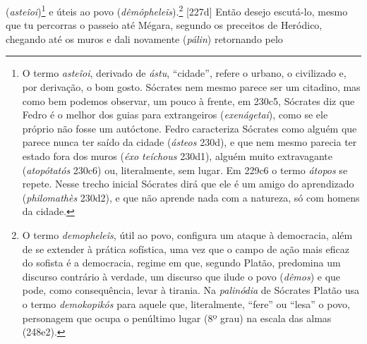 (\emph{asteîoi})\footnote{O termo \emph{asteîoi}, derivado de
  \emph{ástu}, ``cidade'', refere o urbano, o civilizado e, por
  derivação, o bom gosto. Sócrates nem mesmo parece ser um citadino, mas
  como bem podemos observar, um pouco à frente, em 230c5, Sócrates diz
  que Fedro é o melhor dos guias para extrangeiros (\emph{exenágetai}),
  como se ele próprio não fosse um autóctone. Fedro caracteriza Sócrates
  como alguém que parece nunca ter saído da cidade (\emph{ásteos} 230d),
  e que nem mesmo parecia ter estado fora dos muros (\emph{éxo teíchous}
  230d1), alguém muito extravagante (\emph{atopótatós} 230c6) ou,
  literalmente, sem lugar. Em 229c6 o termo \emph{átopos} se repete.
  Nesse trecho inicial Sócrates dirá que ele é um amigo do aprendizado
  (\emph{philomathès} 230d2), e que não aprende nada com a natureza, só
  com homens da cidade.} e úteis ao povo (\emph{dêmôpheleĩs}).\footnote{O
  termo \emph{demopheleîs}, útil ao povo, configura um ataque à
  democracia, além de se extender à prática sofística, uma vez que o
  campo de ação mais eficaz do sofista é a democracia, regime em que,
  segundo Platão, predomina um discurso contrário à verdade, um discurso
  que ilude o povo (\emph{dêmos}) e que pode, como consequência, levar à
  tirania. Na \emph{palinódia} de Sócrates Platão usa o termo
  \emph{demokopikós} para aquele que, literalmente, ``fere'' ou ``lesa''
  o povo, personagem que ocupa o penúltimo lugar (8º grau) na escala das
  almas (248e2).} {[}227d{]} Então desejo escutá-lo, mesmo que tu
percorras o passeio até Mégara, segundo os preceitos de Heródico,
chegando até os muros e dali novamente (\emph{pálin}) retornando pelo
